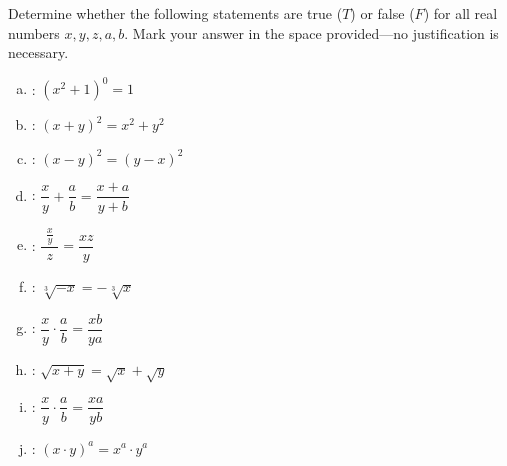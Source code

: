 \documentclass[12pt,letterpaper]{exam}
\begin{document}
\begin{questions}



\newpage
\question[10] Determine whether the following statements are true ($T$) or false ($F$) for all real numbers $x, y, z, a, b$. Mark your answer in the space provided---no justification is necessary. \pvspace{0.5cm}
	\begin{enumerate}[(a)]
	\item {}: $(x^2 + 1)^0= 1$ \vfill
	\item {}: $(x + y)^2= x^2 + y^2$ \vfill
	\item {}: $(x - y)^2= (y - x)^2$ \vfill
	\item {}: $\dfrac{x}{y} + \dfrac{a}{b}= \dfrac{x + a}{y + b}$ \vfill
	\item {}: $\dfrac{\,\,\frac{x}{y}\,\,}{z}= \dfrac{xz}{y}$ \vfill
	\item {}: $\sqrt[3]{-x}= -\sqrt[3]{x}$ \vfill
	\item {}: $\dfrac{x}{y} \cdot \dfrac{a}{b}= \dfrac{xb}{ya}$ \vfill
	\item {}: $\sqrt{x + y}= \sqrt{x} + \sqrt{y}$ \vfill
	\item {}: $\dfrac{x}{y} \cdot \dfrac{a}{b}= \dfrac{xa}{yb}$ \vfill
	\item {}: $(x \cdot y)^a= x^a \cdot y^a$
	\end{enumerate}

\end{questions}
\end{document}
